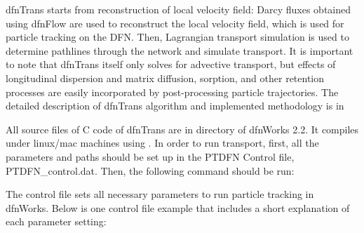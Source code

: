 \documentclass[letterpaper,10pt,english]{sphinxmanual}
\begin{document}
dfnTrans starts from  reconstruction of local velocity field: Darcy fluxes
obtained using dfnFlow are used to reconstruct the local velocity field, which
is used for particle tracking on the DFN. Then, Lagrangian transport simulation
is used to determine pathlines through the network and simulate transport. It is
important to note that dfnTrans itself only solves for advective transport, but
effects of longitudinal dispersion and matrix diffusion, sorption, and other
retention processes are easily incorporated by post-processing particle
trajectories. The detailed description of dfnTrans algorithm and implemented
methodology is in 

All source files of C code of dfnTrans are in  directory of
dfnWorks 2.2. It compiles under linux/mac machines using .  In order
to run transport, first, all the parameters and paths should be set up in the
PTDFN Control file, PTDFN\_control.dat. Then, the following command should be
run:


The control  file sets all necessary parameters to run particle tracking in
dfnWorks.  Below is one control file example that includes a short
explanation of each parameter setting:
\end{document}
